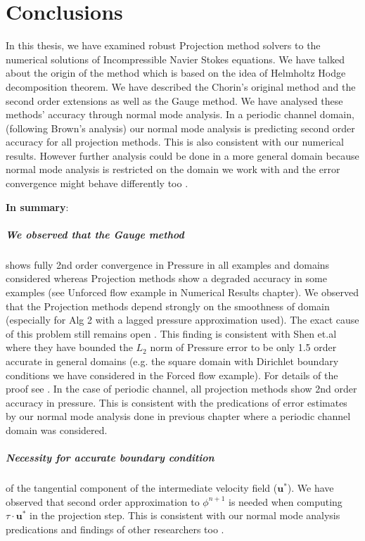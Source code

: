 \chapter{Conclusions}
\label{chapter7}
In this thesis, we have examined robust Projection method solvers to the numerical solutions of Incompressible Navier Stokes equations. We have talked about the origin of the method which is based on the idea of Helmholtz Hodge decomposition theorem. We have described the Chorin's original method and the second order extensions as well as the Gauge method. We have analysed these methods' accuracy through normal mode analysis. In a periodic channel domain,(following Brown's analysis) our normal mode analysis is predicting second order accuracy for all projection methods. This is also consistent with our numerical results. However further analysis could be done in a more general domain because normal mode analysis is restricted on the domain we work with and the error convergence might behave differently too \cite{pyo2005normal}. 

\textbf{In summary}:
\paragraph*{We observed that the Gauge method} shows fully 2nd order convergence in Pressure in all examples and domains considered whereas Projection methods show a degraded accuracy in some examples (see Unforced flow example in Numerical Results chapter). We observed that the Projection methods depend strongly on the smoothness of domain (especially for Alg 2 with a lagged pressure approximation used). The exact cause of this problem still remains open \cite{guermond2004error}. This finding is consistent with Shen et.al where they have bounded the $L_2$ norm of Pressure error to be only 1.5 order accurate in general domains (e.g. the square domain with Dirichlet boundary conditions we have considered in the Forced flow example). For details of the proof see \cite{guermond2004error, pyo2005normal}. In the case of periodic channel, all projection methods show 2nd order accuracy in pressure. This is consistent with the predications of error estimates by our normal mode analysis done in previous chapter where a periodic channel domain was considered. 

\paragraph*{Necessity for accurate boundary condition} of the tangential component of the intermediate velocity field ($\textbf{u}^*$).
We have observed that second order approximation to $\phi^{n+1}$ is needed when computing $\textbf{$\tau$}\cdot\textbf{u}^*$ in the projection step. This is consistent with our normal mode analysis predications and findings of other researchers too \cite{brown2001accurate}.

